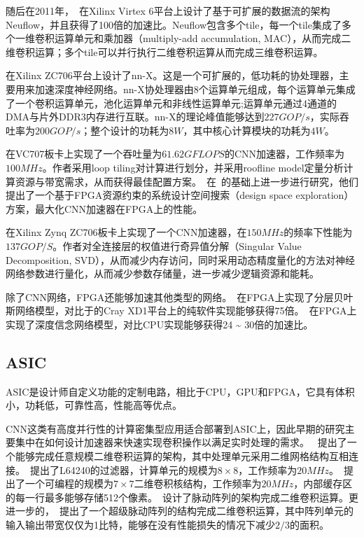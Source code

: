 随后在2011年，~\citet{farabet2011neuflow}在Xilinx Virtex 6平台上设计了基于可扩展的数据流的架构Neuflow，并且获得了100倍的加速比。Neuflow包含多个tile，每一个tile集成了多个一维卷积运算单元和乘加器（multiply-add accumulation, MAC），从而完成二维卷积运算；多个tile可以并行执行二维卷积运算从而完成三维卷积运算。

\citet{gokhale2014240}在Xilinx ZC706平台上设计了nn-X。这是一个可扩展的，低功耗的协处理器，主要用来加速深度神经网络。nn-X协处理器由8个运算单元组成，每个运算单元集成了一个卷积运算单元，池化运算单元和非线性运算单元;运算单元通过4通道的DMA与片外DDR3内存进行互联。nn-X的理论峰值能够达到$227GOP/s$，实际吞吐率为$200GOP/s$；整个设计的功耗为$8W$，其中核心计算模块的功耗为$4W$。

\citet{zhang2015optimizing}在VC707板卡上实现了一个吞吐量为$61.62GFLOPS$的CNN加速器，工作频率为$100MHz$。作者采用loop tiling对计算进行划分，并采用roofline model定量分析计算资源与带宽需求，从而获得最佳配置方案。~\citet{suda2016throughput}在~\citet{zhang2015optimizing}的基础上进一步进行研究，他们提出了一个基于FPGA资源约束的系统设计空间搜索（design space exploration）方案，最大化CNN加速器在FPGA上的性能。

\citet{qiu2016going}在Xilinx Zynq ZC706板卡上实现了一个CNN加速器，在$150MHz$的频率下性能为$137GOP/S$。作者对全连接层的权值进行奇异值分解（Singular Value Decomposition, SVD），从而减少内存访问，同时采用动态精度量化的方法对神经网络参数进行量化，从而减少参数存储量，进一步减少逻辑资源和能耗。

除了CNN网络，FPGA还能够加速其他类型的网络。~\citet{rice2009scaling}在FPGA上实现了分层贝叶斯网络模型，对比于的Cray XD1平台上的纯软件实现能够获得75倍。~\citet{kim2009highly}在FPGA上实现了深度信念网络模型，对比CPU实现能够获得24 \~{} 30倍的加速比。


\subsection{ASIC}
ASIC是设计师自定义功能的定制电路，相比于CPU，GPU和FPGA，它具有体积小，功耗低，可靠性高，性能高等优点。

CNN这类有高度并行性的计算密集型应用适合部署到ASIC上，因此早期的研究主要集中在如何设计加速器来快速实现卷积操作以满足实时处理的需求。
~\citet{lee1987parallel}提出了一个能够完成任意规模二维卷积运算的架构，其中处理单元采用二维网格结构互相连接。~\citet{stearns1988reconfigurable}提出了L64240的过滤器，计算单元的规模为$8\times 8$，工作频率为$20MHz$。~\citet{kamp1990programmable}提出了一个可编程的规模为$7\times 7$二维卷积核结构，工作频率为$20MHz$，内部缓存区的每一行最多能够存储512个像素。~\citet{hecht1991advanced}设计了脉动阵列的架构完成二维卷积运算。更进一步的，~\citet{lee2006super}提出了一个超级脉动阵列的结构完成二维卷积运算，其中阵列单元的输入输出带宽仅仅为1比特，能够在没有性能损失的情况下减少$2/3$的面积。


